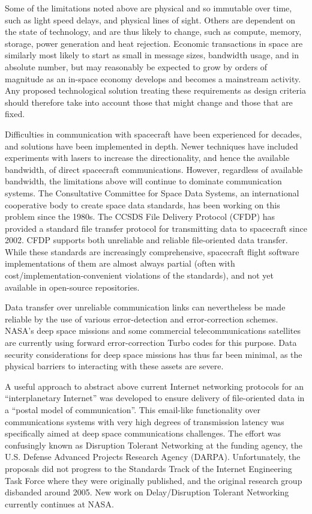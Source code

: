 \documentclass[journal ]{new-aiaa}
\begin{document}
Some of the limitations noted above are physical and so immutable over time, such as light speed delays, and physical lines of sight. Others are dependent on the state of technology, and are thus likely to change, such as compute, memory, storage, power generation and heat rejection. Economic transactions in space are similarly most likely to start as small in message sizes, bandwidth usage, and in absolute number, but may reasonably be expected to grow by orders of magnitude as an in-space economy develops and becomes a mainstream activity. Any proposed technological solution treating these requirements as design criteria should therefore take into account those that might change and those that are fixed.

Difficulties in communication with spacecraft have been experienced for decades, and solutions have been implemented in depth. Newer techniques have included experiments with lasers to increase the directionality, and hence the available bandwidth, of direct spacecraft communications. However, regardless of available bandwidth, the limitations above will continue to dominate communication systems. The Consultative Committee for Space Data Systems, an international cooperative body to create space data standards, has been working on this problem since the 1980s. The CCSDS File Delivery Protocol (CFDP) has provided a standard file transfer protocol for transmitting data to spacecraft since 2002\cite{CCSDS_2007}. CFDP supports both unreliable and reliable file-oriented data transfer. While these standards are increasingly comprehensive, spacecraft flight software implementations of them are almost always partial (often with cost/implementation-convenient violations of the standards), and not yet available in open-source repositories.

Data transfer over unreliable communication links can nevertheless be made reliable by the use of various error-detection and error-correction schemes. NASA's deep space missions and some commercial telecommunications satellites are currently using forward error-correction Turbo codes\cite{berrou_near_1993} for this purpose.  Data security considerations for deep space missions has thus far been minimal, as the physical barriers to interacting with these assets are severe.

A useful approach to abstract above current Internet networking protocols for an ``interplanetary Internet'' was developed to ensure delivery of file-oriented data in a ``postal model of communication''\cite{burleigh_delay-tolerant_2003}. This email-like functionality over communications systems with very high degrees of transmission latency was specifically aimed at deep space communications challenges. The effort was confusingly known as Disruption Tolerant Networking at the funding agency, the U.S. Defense Advanced Projects Research Agency (DARPA). Unfortunately, the proposals did not progress to the Standards Track of the Internet Engineering Task Force where they were originally published, and the original research group disbanded around 2005. New work on Delay/Disruption Tolerant Networking currently continues at NASA\cite{mahoney_disruption_2016}.
\end{document}
